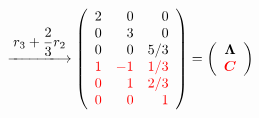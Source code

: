 \begin{frame}
\begin{jie}
$$\begin{array}{rl}
      &\xlongrightarrow[]{\ds r_3+\frac23r_2}
      \left(
      \begin{array}{rrr}
        2&0&0\\
        0&3&0\\
        0&0&\ds5/3\\
        \red{1}&\red{-1}&\red{1/3}\\
        \red{0}&\red{1}&\red{2/3}\\
        \red{0}&\red{0}&\red{1}
      \end{array}
      \right)=\left(
      \begin{array}{c}
        \Lambdabd\\
        \red{\MC}
      \end{array}
      \right)
    \end{array}
    $$
  \end{jie}
\end{frame}
